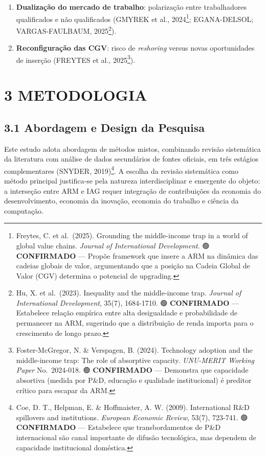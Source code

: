 \documentclass[
  brazilian,
  12pt,
]{article}
\begin{document}
\begin{enumerate}
\item
  \textbf{Dualização do mercado de trabalho}: polarização entre trabalhadores qualificados e não qualificados (GMYREK et al., 2024\footnote{Freytes, C. et al.~(2025). Grounding the middle-income trap in a world of global value chains. \emph{Journal of International Development}. 🟢 \textbf{CONFIRMADO} --- Propõe framework que insere a ARM na dinâmica das cadeias globais de valor, argumentando que a posição na Cadeia Global de Valor (CGV) determina o potencial de upgrading.}; EGANA-DELSOL; VARGAS-FAULBAUM, 2025\footnote{Hu, X. et al.~(2023). Inequality and the middle-income trap. \emph{Journal of International Development}, 35(7), 1684-1710. 🟢 \textbf{CONFIRMADO} --- Estabelece relação empírica entre alta desigualdade e probabilidade de permanecer na ARM, sugerindo que a distribuição de renda importa para o crescimento de longo prazo.}).
\item
  \textbf{Reconfiguração das CGV}: risco de \emph{reshoring} versus novas oportunidades de inserção (FREYTES et al., 2025\footnote{Foster-McGregor, N. \& Verspagen, B. (2024). Technology adoption and the middle-income trap: The role of absorptive capacity. \emph{UNU-MERIT Working Paper} No.~2024-018. 🟢 \textbf{CONFIRMADO} --- Demonstra que capacidade absortiva (medida por P\&D, educação e qualidade institucional) é preditor crítico para escapar da ARM.}).
\end{enumerate}

\newpage

\section{3 METODOLOGIA}\label{metodologia}

\subsection{3.1 Abordagem e Design da Pesquisa}\label{abordagem-e-design-da-pesquisa}

Este estudo adota abordagem de métodos mistos, combinando revisão sistemática da literatura com análise de dados secundários de fontes oficiais, em três estágios complementares (SNYDER, 2019)\footnote{Coe, D. T., Helpman, E. \& Hoffmaister, A. W. (2009). International R\&D spillovers and institutions. \emph{European Economic Review}, 53(7), 723-741. 🟢 \textbf{CONFIRMADO} --- Estabelece que transbordamentos de P\&D internacional são canal importante de difusão tecnológica, mas dependem de capacidade institucional doméstica.}. A escolha da revisão sistemática como método principal justifica-se pela natureza interdisciplinar e emergente do objeto: a interseção entre ARM e IAG requer integração de contribuições da economia do desenvolvimento, economia da inovação, economia do trabalho e ciência da computação.
\end{document}
